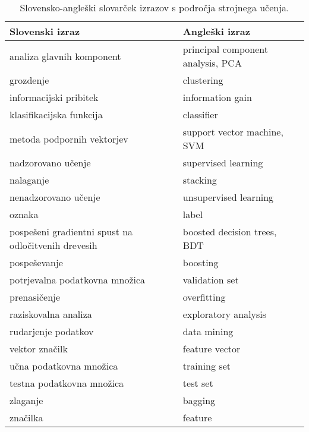 \begin{table}[ht]
	\centering
	\begin{tabular}{ll}
		\hline
		\textbf{Slovenski izraz} & \textbf{Angleški izraz} \\
		\hline
		analiza glavnih komponent & principal component analysis, PCA \\
		grozdenje & clustering \\
		informacijski pribitek & information gain \\
		klasifikacijska funkcija & classifier \\
		metoda podpornih vektorjev & support vector machine, SVM \\
		nadzorovano učenje & supervised learning \\
		nalaganje & stacking \\
		nenadzorovano učenje & unsupervised learning \\
		oznaka & label \\
		pospešeni gradientni spust na odločitvenih drevesih & boosted decision trees, BDT \\
		pospeševanje & boosting \\
		potrjevalna podatkovna množica & validation set \\
		prenasičenje & overfitting \\
		raziskovalna analiza & exploratory analysis \\
		rudarjenje podatkov & data mining \\		
		vektor značilk & feature vector \\
		učna podatkovna množica & training set \\	
		testna podatkovna množica & test set \\
		zlaganje & bagging \\	
		značilka & feature \\
	\end{tabular}
	\caption{Slovensko-angleški slovarček izrazov s področja strojnega učenja.}
	\label{slovar}
\end{table}
